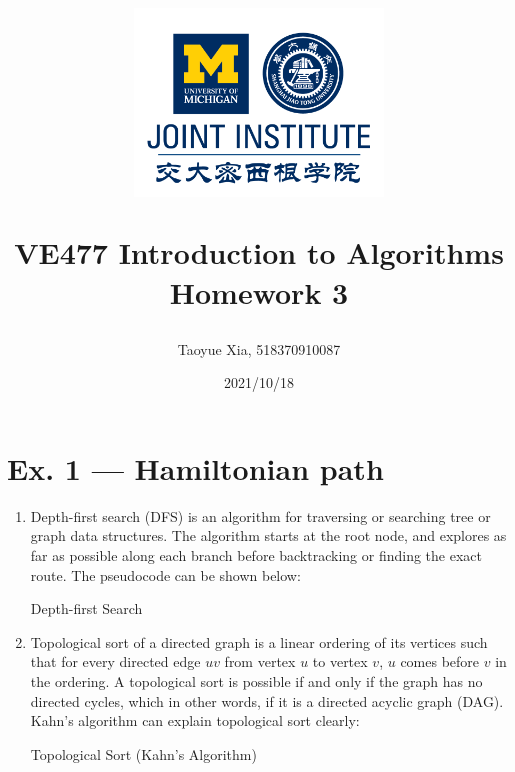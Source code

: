 \documentclass[12pt, a4paper]{article}
\title{
    \begin{figure}[H]
        \centering
        \includegraphics[width=7cm, height=5cm]{AAA.png}
    \end{figure}
    VE477 Introduction to Algorithms\\ 
    Homework 3}
\author{Taoyue Xia, 518370910087}
\date{2021/10/18}
\begin{document}
\maketitle

\newpage

\section*{Ex. 1 --- Hamiltonian path}
\begin{enumerate}
    \item Depth-first search (DFS) is an algorithm for traversing or searching tree or graph data structures. 
          The algorithm starts at the root node, and explores as far as possible along each branch before backtracking or finding the exact route. 
          The pseudocode can be shown below:

          \begin{algorithm}
              \caption{Depth-first Search}
              \BlankLine

          \end{algorithm}

    \item Topological sort of a directed graph is a linear ordering of its vertices such that for every directed edge $uv$ from vertex $u$ to vertex $v$, 
          $u$ comes before $v$ in the ordering. A topological sort is possible if and only if the graph has no directed cycles, 
          which in other words, if it is a directed acyclic graph (DAG). Kahn's algorithm can explain topological sort clearly:

          \begin{algorithm}[!htb]
              \caption{Topological Sort (Kahn's Algorithm)}
              \BlankLine
\end{algorithm}
\end{enumerate}
\end{document}
